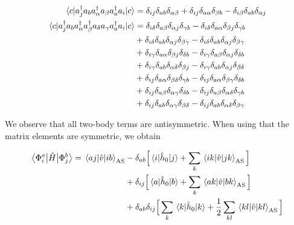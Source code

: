 \begin{align}
\mel{c}{a_j^{\dagger}a_ba_{\alpha}^{\dagger}a_{\beta}a_a^{\dagger}a_i}{c}
&=\delta_{ij}\delta_{ab}\delta_{\alpha\beta}+\delta_{ij}\delta_{a\alpha}\delta_{\beta b}-\delta_{i\beta}\delta_{ab}\delta_{\alpha j}\\
\mel{c}{a_j^{\dagger}a_ba_{\alpha}^{\dagger}a_{\beta}^{\dagger}a_{\delta}a_{\gamma}a_a^{\dagger}a_i}{c}
&=\delta_{i\delta}\delta_{a\beta}\delta_{\alpha j}\delta_{\gamma b}-\delta_{i\delta}\delta_{a\alpha}\delta_{\beta j}\delta_{\gamma b}\notag\\
&+\delta_{i\delta}\delta_{ab}\delta_{\alpha j}\delta_{\beta\gamma}-\delta_{i\delta}\delta_{ab}\delta_{\alpha j}\delta_{\beta\gamma}\notag\\
&+\delta_{i\gamma}\delta_{a\alpha}\delta_{\beta j}\delta_{\delta b}-\delta_{i\gamma}\delta_{a\beta}\delta_{\alpha j}\delta_{\delta b}\notag\\
&+\delta_{i\gamma}\delta_{ab}\delta_{\alpha \delta}\delta_{\beta j} -\delta_{i\gamma}\delta_{ab}\delta_{\alpha j}\delta_{\beta\delta}\\
&+\delta_{ij}\delta_{a\alpha}\delta_{\beta \delta}\delta_{\gamma b} -\delta_{ij}\delta_{a\alpha}\delta_{\beta \gamma}\delta_{\delta b}\notag\\
&+\delta_{ij}\delta_{a\beta}\delta_{\alpha \gamma}\delta_{\delta b} -\delta_{ij}\delta_{a\beta}\delta_{\alpha \delta}\delta_{\gamma b}\notag\\
&+\delta_{ij}\delta_{ab}\delta_{\alpha \gamma}\delta_{\beta\delta} -\delta_{ij}\delta_{ab}\delta_{\alpha \delta}\delta_{\beta\gamma}\notag
\end{align}

We observe that all two-body terms are antisymmetric. When using that the matrix elements are symmetric, we obtain

\begin{align}
\mel{\Phi_i^a}{\hat{H}}{\Phi_j^b}=\mel{aj}{\hat{v}}{ib}_{\text{AS}}&-\delta_{ab}\Big[\mel{i}{\hat{h}_0}{j}+\sum_k\mel{ik}{\hat{v}}{jk}_{\text{AS}}\Big]\notag\\
&+\delta_{ij}\Big[\mel{a}{\hat{h}_0}{b}+\sum_k\mel{ak}{\hat{v}}{bk}_{\text{AS}}\Big]\\
&+\delta_{ab}\delta_{ij}\Big[\sum_k\mel{k}{\hat{h}_0}{k}+\frac{1}{2}\sum_{kl}\mel{kl}{\hat{v}}{kl}_{\text{AS}}\Big]\notag
\label{eq:ia_H_jb}
\end{align}